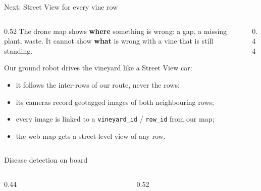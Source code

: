 \begin{frame}{Next: Street View for every vine row}
  \begin{columns}[T]
    \begin{column}{0.52\textwidth}
      \footnotesize
      The drone map shows \textbf{where} something is wrong: a gap, a missing plant, waste.
      It cannot show \textbf{what} is wrong with a vine that is still standing.
      \vspace{2.5mm}

      Our ground robot drives the vineyard like a Street View car:
      \begin{itemize}\setlength{\itemsep}{0.5mm}\scriptsize
        \item it follows the inter-rows of our route, never the rows;
        \item its cameras record geotagged images of both neighbouring rows;
        \item every image is linked to a \texttt{vineyard\_id} / \texttt{row\_id} from our map;
        \item the web map gets a street-level view of any row.
      \end{itemize}
    \end{column}
    \begin{column}{0.44\textwidth}
    \end{column}
  \end{columns}
\end{frame}

\begin{frame}{Disease detection on board}
  \begin{columns}[T]
    \begin{column}{0.44\textwidth}
    \end{column}
    \begin{column}{0.52\textwidth}
    \end{column}
  \end{columns}
\end{frame}

